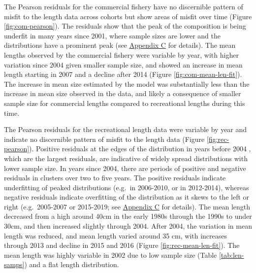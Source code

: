 \documentclass[11pt,
  english,
  a4paper,
]{article}
\begin{document}
The Pearson residuals for the commercial fishery have no discernible pattern of misfit to the length data across cohorts but show areas of misfit over time (Figure \ref{fig:com-pearson}). The residuals show that the peak of the composition is being underfit in many years since 2001, where sample sizes are lower and the distributions have a prominent peak (see {\protect\hyperlink{append_c}{Appendix C}\leavevmode\tagmcend\tagstructend} for details). The mean lengths observed by the commercial fishery were variable by year, with higher variation since 2004 given smaller sample size, and showed an increase in mean length starting in 2007 and a decline after 2014 (Figure \ref{fig:com-mean-len-fit}). The increase in mean size estimated by the model was substantially less than the increase in mean size observed in the data, and likely a consequence of smaller sample size for commercial lengths compared to recreational lengths during this time.

\leavevmode\tagmcend\tagstructend\par


The Pearson residuals for the recreational length data were variable by year and indicate no discernible pattern of misfit to the length data (Figure \ref{fig:rec-pearson}). Positive residuals at the edges of the distribution in years before 2004 , which are the largest residuals, are indicative of widely spread distributions with lower sample size. In years since 2004, there are periods of positive and negative residuals in clusters over two to five years. The positive residuals indicate underfitting of peaked distributions (e.g.~in 2006-2010, or in 2012-2014), whereas negative residuals indicate overfitting of the distribution as it skews to the left or right (e.g.~2005-2007 or 2015-2019; see {\protect\hyperlink{append_c}{Appendix C}\leavevmode\tagmcend\tagstructend} for details). The mean length decreased from a high around 40cm in the early 1980s through the 1990s to under 30cm, and then increased slightly through 2004. After 2004, the variation in mean length was reduced, and mean length varied around 35 cm, with increases through 2013 and decline in 2015 and 2016 (Figure \ref{fig:rec-mean-len-fit}). The mean length was highly variable in 2002 due to low sample size (Table \ref{tab:len-samps}) and a flat length distribution.

\leavevmode\tagmcend\tagstructend\par
\end{document}
